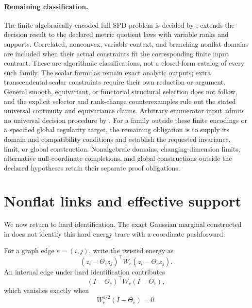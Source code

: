 \paragraph{Remaining classification.}
The finite algebraically encoded full-SPD problem is
decided by ;
 extends
the decision result to the declared metric quotient
laws with variable ranks and supports. Correlated,
nonconvex, variable-context, and branching nonflat
domains are included when their actual constraints
fit the corresponding finite input contract.
These are algorithmic classifications, not a
closed-form catalog of every such family.
The scalar formulas remain exact analytic outputs;
extra transcendental scalar constraints require
their own reduction or argument. General smooth,
equivariant, or functorial structural selection
does not follow, and the explicit selector and
rank-change counterexamples rule out the stated
universal continuity and equivariance claims.
Arbitrary enumerator input admits no universal
decision procedure by
.
For a family outside these finite encodings or a
specified global regularity target, the remaining
obligation is to supply its domain and compatibility
conditions and establish the requested invariance,
limit, or global construction. Nonalgebraic domains,
changing-dimension limits, alternative null-coordinate
completions, and global constructions outside the
declared hypotheses retain their separate proof
obligations. 

\section{Nonflat links and effective support}
\label{sec:cg-effective-support}

We now return to hard identification. The exact Gaussian marginal
constructed in  does not identify
this hard energy trace with a coordinate pushforward.

For a graph edge \(e=(i,j)\), write the twisted energy as
\begin{equation}
(z_i-\Theta_ez_j)^\top W_e(z_i-\Theta_ez_j).
\label{eq:cg-twisted-pair}
\end{equation}
An internal edge under hard identification contributes
\begin{equation}
(I-\Theta_e)^\top W_e(I-\Theta_e),
\label{eq:cg-internal-residual}
\end{equation}
which vanishes exactly when
\begin{equation}
W_e^{1/2}(I-\Theta_e)=0.
\label{eq:cg-weighted-invisibility}
\end{equation}

